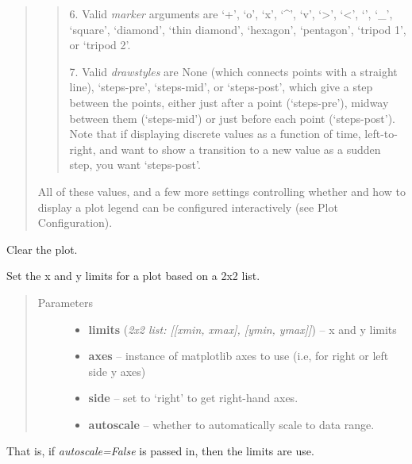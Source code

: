 \documentclass[letterpaper,10pt,english]{sphinxmanual}
\begin{document}
\begin{quote}
\begin{quote}
6. Valid \emph{marker} arguments are `+', `o', `x', `\textasciicircum{}', `v', `\textgreater{}', `\textless{}', `\textbar{}', `\_',
`square', `diamond', `thin diamond', `hexagon', `pentagon', `tripod 1', or
`tripod 2'.

7. Valid \emph{drawstyles} are None (which connects points with a straight line),
`steps-pre', `steps-mid', or `steps-post', which give a step between the
points, either just after a point (`steps-pre'), midway between them
(`steps-mid') or just before each point (`steps-post').   Note that if displaying
discrete values as a function of time, left-to-right, and want to show a
transition to a new value as a sudden step, you want `steps-post'.
\end{quote}

All of these values, and a few more settings controlling whether and how to
display a plot legend can be configured interactively (see Plot Configuration).
\end{quote}


\begin{fulllineitems}
\label{plotpanel:clear}
Clear the plot.

\end{fulllineitems}



\begin{fulllineitems}
\label{plotpanel:set_xylims}
Set the x and y limits for a plot based on a 2x2 list.
\begin{quote}\begin{description}
\item[{Parameters}] \leavevmode\begin{itemize}
\item {} 
\textbf{limits} (\emph{2x2 list: {[}{[}xmin, xmax{]}, {[}ymin, ymax{]}{]}}) -- x and y limits

\item {} 
\textbf{axes} -- instance of matplotlib axes to use (i.e, for right or left side y axes)

\item {} 
\textbf{side} -- set to `right' to get right-hand axes.

\item {} 
\textbf{autoscale} -- whether to automatically scale to data range.

\end{itemize}

\end{description}\end{quote}

That is, if \emph{autoscale=False} is passed in, then the limits are use.

\end{fulllineitems}
\end{document}
